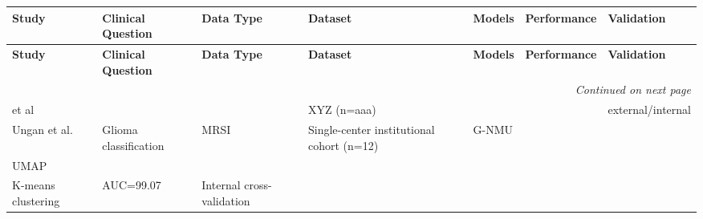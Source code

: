 \documentclass{article}
\begin{document}
\fontsize{8}{10}\selectfont

\begin{longtable}{p{2.2cm}p{2.2cm}p{1.3cm}p{2.8cm}p{2cm}p{1.5cm}p{2.3cm}}
\toprule
\textbf{Study} & \textbf{Clinical Question} & \textbf{Data Type} & \textbf{Dataset} & \textbf{Models} & \textbf{Performance} & \textbf{Validation} \\
\midrule
\endfirsthead
\toprule
\textbf{Study} & \textbf{Clinical Question} & \textbf{Data Type} & \textbf{Dataset} & \textbf{Models} & \textbf{Performance} & \textbf{Validation} \\
\midrule
\endhead
\midrule
\multicolumn{7}{r}{\footnotesize\textit{Continued on next page}} \\
\endfoot
\bottomrule
\endlastfoot
et al & & & XYZ (n=aaa) & & & external/internal \\
\hline
Ungan et al. & Glioma classification & MRSI & Single-center institutional cohort (n=12) & G-NMU\\UMAP\\K-means clustering & AUC=99.07 & Internal cross-validation \\
\end{longtable}
\end{document}
